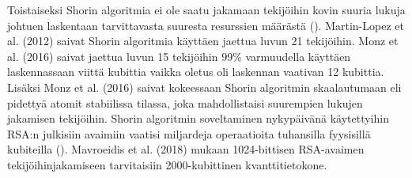 Toistaiseksi Shorin algoritmia ei ole saatu jakamaan tekijöihin kovin suuria lukuja johtuen laskentaan tarvittavasta suuresta resurssien määrästä (\cite{martin2012experimental}). Martin-Lopez et al. (2012) saivat Shorin algoritmia käyttäen jaettua luvun 21 tekijöihin. Monz et al. (2016) saivat jaettua luvun 15 tekijöihin 99\% varmuudella käyttäen laskennassaan viittä kubittia vaikka oletus oli laskennan vaativan 12 kubittia. Lisäksi Monz et al. (2016) saivat kokeessaan Shorin algoritmin skaalautumaan eli pidettyä atomit stabiilissa tilassa, joka mahdollistaisi suurempien lukujen jakamisen tekijöihin. Shorin algoritmin soveltaminen nykypäivänä käytettyihin RSA:n julkisiin avaimiin vaatisi miljardeja operaatioita tuhansilla fyysisillä kubiteilla (\cite{bernstein2017post}). Mavroeidis et al. (2018) mukaan 1024-bittisen RSA-avaimen tekijöihinjakamiseen tarvitaisiin 2000-kubittinen kvanttitietokone.